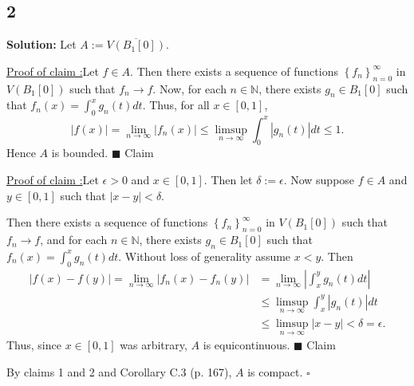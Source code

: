 \documentclass[12pt]{article}
\newcounter{ProofCounter}
\newcounter{ClaimCounter}[ProofCounter]
\newenvironment{Solution}{\stepcounter{ProofCounter}\textbf{Solution:}}{\hfill$\square$}
\newenvironment{claim}[1]{\vspace{1mm}\stepcounter{ClaimCounter}\par\noindent\underline{\bf Claim \theClaimCounter:}\space#1}{}
\newenvironment{claimproof}[1]{\par\noindent\underline{Proof of claim \theClaimCounter:}\space#1}{\hfill $\blacksquare$ Claim \theClaimCounter}
\begin{document}
\subsection*{2}
\begin{Solution}
  Let $A := \overline{V(B_1[0])}$.

  \begin{claimproof}
    Let $f \in A$. Then there exists a sequence of functions $\left\{ f_n \right\}_{n=0}^{\infty}$ in $V(B_1[0])$ such that $f_n \rightarrow f$. Now, for each
    $n \in \mathbb{N}$, there exists $g_n \in B_1[0]$ such that $f_n(x) = \int_{0}^{x}g_n(t)dt$. Thus, for all $x \in [0,1]$,
    \[
      |f(x)| = \lim_{n\rightarrow\infty}|f_n(x)| \leq \limsup_{n\rightarrow\infty}\int_{0}^{x}|g_n(t)|dt \leq 1.
    \]
    Hence $A$ is bounded.
  \end{claimproof}

  \begin{claimproof}
    Let $\epsilon > 0$ and $x \in [0,1]$. Then let $\delta := \epsilon$. Now suppose $f \in A$ and $y \in [0,1]$ such that $|x - y| < \delta$. 
    
    Then there exists a sequence of functions $\left\{
    f_n \right\}_{n=0}^{\infty}$ in $V(B_1[0])$ such that $f_n \rightarrow f$, and for each $n \in \mathbb{N}$, there exists $g_n \in B_1[0]$ such that 
    $f_n(x) = \int_{0}^{x}g_n(t)dt$. Without loss of generality assume $x < y$. Then
    \begin{align*}
      |f(x) - f(y)| = \lim_{n\rightarrow\infty}|f_n(x) - f_n(y)| & = \lim_{n\rightarrow\infty}\left|\int_{x}^{y}g_n(t)dt\right| \\
      & \leq \limsup_{n\rightarrow\infty} \int_{x}^{y}|g_n(t)|dt \\
      & \leq \limsup_{n\rightarrow\infty} |x-y| < \delta = \epsilon.
    \end{align*}
    Thus, since $x \in [0,1]$ was arbitrary, $A$ is equicontinuous.
  \end{claimproof}

  By claims 1 and 2 and Corollary C.3 (p. 167), $A$ is compact.
\end{Solution}
\end{document}
